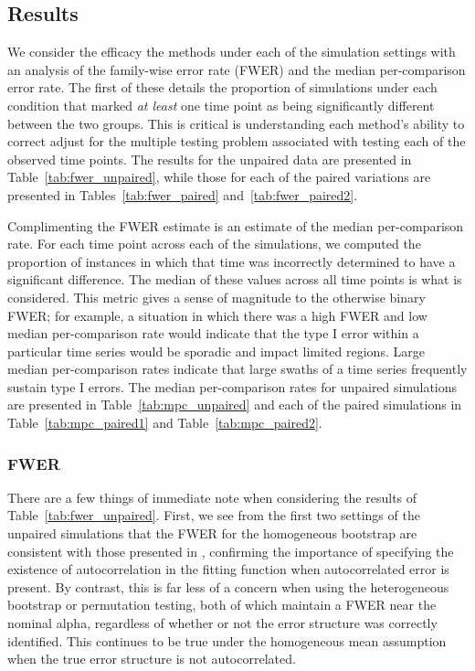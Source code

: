 \subsection{Results}

We consider the efficacy the methods under each of the simulation settings with an analysis of the family-wise error rate (FWER) and the median per-comparison error rate. The first of these details the proportion of simulations under each condition that marked \textit{at least} one time point as being significantly different between the two groups. This is critical is understanding each method's ability to correct adjust for the multiple testing problem associated with testing each of the observed time points. The results for the unpaired data are presented in Table~\ref{tab:fwer_unpaired}, while those for each of the paired variations are presented in Tables~\ref{tab:fwer_paired} and~\ref{tab:fwer_paired2}.



Complimenting the FWER estimate is an estimate of the median per-comparison rate. For each time point across each of the simulations, we computed the proportion of instances in which that time was incorrectly determined to have a significant difference. The median of these values across all time points is what is considered. This metric gives a sense of magnitude to the otherwise binary FWER; for example, a situation in which there was a high FWER and low median per-comparison rate would indicate that the type I error within a particular time series would be sporadic and impact limited regions. Large median per-comparison rates indicate that large swaths of a time series frequently sustain type I errors. The median per-comparison rates for unpaired simulations are presented in Table~\ref{tab:mpc_unpaired} and each of the paired simulations in Table~\ref{tab:mpc_paired1} and Table~\ref{tab:mpc_paired2}.


\subsubsection{FWER}



There are a few things of immediate note when considering the results of Table~\ref{tab:fwer_unpaired}. First, we see from the first two settings of the unpaired simulations that the FWER for the homogeneous bootstrap are consistent with those presented in \citet{oleson2017detecting}, confirming the importance of specifying the existence of autocorrelation in the  fitting function when autocorrelated error is present. By contrast, this is far less of a concern when using the heterogeneous bootstrap or permutation testing, both of which maintain a FWER near the nominal alpha, regardless of whether or not the error structure was correctly identified. This continues to be true under the homogeneous mean assumption when the true error structure is not autocorrelated. 

